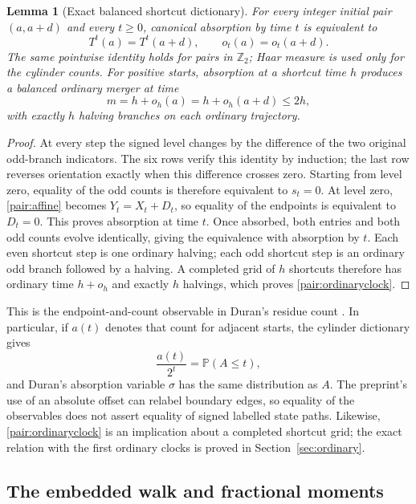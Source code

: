 \documentclass[11pt]{amsart}
\newtheorem{lemma}[theorem]{Lemma}
\theoremstyle{definition}
\theoremstyle{remark}
\newcommand{\PP}{\mathbb P}
\newcommand{\Ztwo}{\mathbb Z_2}
\begin{document}
\begin{lemma}[Exact balanced shortcut dictionary]\label{pair:dictionary}
For every integer initial pair $(a,a+d)$ and every $t\ge0$, canonical
absorption by time $t$ is equivalent to
\begin{equation}\label{pair:balancedshortcut}
 T^t(a)=T^t(a+d),\qquad o_t(a)=o_t(a+d).
\end{equation}
The same pointwise identity holds for pairs in $\Ztwo$; Haar measure
is used only for the cylinder counts.
For positive starts, absorption at a shortcut time $h$ produces a balanced
ordinary merger at time
\begin{equation}\label{pair:ordinaryclock}
 m=h+o_h(a)=h+o_h(a+d)\le2h,
\end{equation}
with exactly $h$ halving branches on each ordinary trajectory.
\end{lemma}
\begin{proof}
At every step the signed level changes by the difference of the two original
odd-branch indicators.  The six rows verify this identity by induction;
the last row reverses orientation exactly when this difference crosses
zero.  Starting from level zero, equality of the odd counts is therefore
equivalent to $s_t=0$.  At level zero, \eqref{pair:affine} becomes
$Y_t=X_t+D_t$, so equality of the endpoints is equivalent to $D_t=0$.
This proves absorption at time $t$.  Once absorbed, both entries and both
odd counts evolve identically, giving the equivalence with absorption by
$t$.  Each even shortcut step is one ordinary halving; each odd shortcut
step is an ordinary odd branch followed by a halving.  A completed grid of
$h$ shortcuts therefore has ordinary time $h+o_h$ and exactly $h$ halvings,
which proves \eqref{pair:ordinaryclock}.
\end{proof}

This is the endpoint-and-count observable in Duran's residue count
\cite[Corollary~C and Sections~2.2--2.4]{Duran2026}.  In particular, if $a(t)$
denotes that count for adjacent starts, the cylinder dictionary gives
\[
 \frac{a(t)}{2^t}=\PP(A\le t),
\]
and Duran's absorption variable $\sigma$ has the same distribution as $A$.
The preprint's use of an absolute offset can relabel boundary edges, so equality of
the observables does not assert equality of signed labelled state paths.
Likewise, \eqref{pair:ordinaryclock} is an implication about a completed
shortcut grid; the exact relation with the first ordinary clocks is proved in
Section~\ref{sec:ordinary}.

\subsection{The embedded walk and fractional moments}
\end{document}
